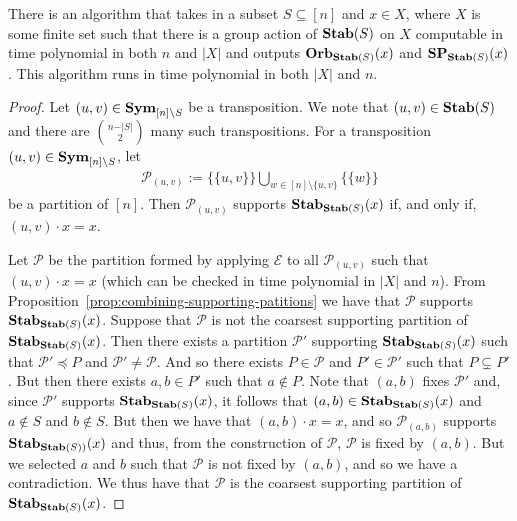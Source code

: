 \documentclass[../paper.tex]{subfiles}
\begin{document}
\begin{lem}
  \label{lem:computing-support-orbit}
  There is an algorithm that takes in a subset $S \subseteq [n]$ and $x \in X$,
  where $X$ is some finite set such that there is a group action of $\text{\textbf{Stab}}(S)$
  on $X$ computable in time polynomial in both $n$ and $\vert X \vert$ and
  outputs $\text{\textbf{Orb}}_{\text{\textbf{Stab}}(S)} (x)$ and $\text{\textbf{SP}}_{\text{\textbf{Stab}}(S)}(x)$. This algorithm runs in
  time polynomial in both $\vert X \vert$ and $n$.
\end{lem}
\begin{proof}
  Let $(u, v) \in \text{\textbf{Sym}}_{[n] \setminus S}$ be a transposition. We note that
  $(u,v) \in \text{\textbf{Stab}}(S)$ and there are ${n - \vert S \vert}\choose{2}$ many such
  transpositions. For a transposition $(u, v) \in \text{\textbf{Sym}}_{[n] \setminus S}$, let
  \begin{align*}
    \mathcal{P}_{(u,v)} := \{ \{u,v\}\} \bigcup_{w \in [n] \setminus \{ u,v \}} \{ \{ w \} \}
  \end{align*}
  be a partition of $[n]$. Then $\mathcal{P}_{(u,v)}$ supports
  $\text{\textbf{Stab}}_{\text{\textbf{Stab}}(S)}(x)$ if, and only if, $(u,v) \cdot x = x$.

  Let $\mathcal{P}$ be the partition formed by applying $\mathcal{E}$ to all
  $\mathcal{P}_{(u,v)}$ such that $(u,v) \cdot x = x$ (which can be checked in
  time polynomial in $\vert X \vert$ and $n$). From
  Proposition~\ref{prop:combining-supporting-patitions} we have that
  $\mathcal{P}$ supports $\text{\textbf{Stab}}_{\text{\textbf{Stab}}(S)}(x)$. Suppose that $\mathcal{P}$ is
  not the coarsest supporting partition of $\text{\textbf{Stab}}_{\text{\textbf{Stab}}(S)}(x)$. Then there
  exists a partition $\mathcal{P}'$ supporting $\text{\textbf{Stab}}_{\text{\textbf{Stab}}(S)}(x)$ such that
  $\mathcal{P}' \preceq P$ and $\mathcal{P}' \neq \mathcal{P}$. And so there
  exists $P \in \mathcal{P}$ and $P' \in \mathcal{P}'$ such that $P \subsetneq
  P'$. But then there exists $a , b \in P'$ such that $a \not\in P$. Note that
  $(a,b)$ fixes $\mathcal{P}'$ and, since $\mathcal{P}'$ supports
  $\text{\textbf{Stab}}_{\text{\textbf{Stab}}(S)}(x)$, it follows that $(a,b) \in \text{\textbf{Stab}}_{\text{\textbf{Stab}}(S)}(x)$ and $a
  \not\in S$ and $b \not\in S$. But then we have that $(a,b) \cdot x = x$, and
  so $\mathcal{P}_{(a,b)}$ supports $\text{\textbf{Stab}}_{\text{\textbf{Stab}}(S))}(x)$ and thus, from the
  construction of $\mathcal{P}$, $\mathcal{P}$ is fixed by $(a,b)$. But we
  selected $a$ and $b$ such that $\mathcal{P}$ is not fixed by $(a,b)$, and so
  we have a contradiction. We thus have that $\mathcal{P}$ is the coarsest
  supporting partition of $\text{\textbf{Stab}}_{\text{\textbf{Stab}}(S)}(x)$.


\end{proof}
\end{document}
